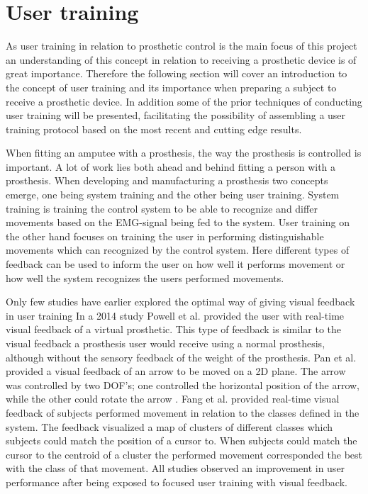 
\section{User training} \label{sec:BG:userTraining}

As user training in relation to prosthetic control is the main focus of this project an understanding of this concept in relation to receiving a prosthetic device is of great importance. Therefore the following section will cover an introduction to the concept of user training and its importance when preparing a subject to receive a prosthetic device. In addition some of the prior techniques of conducting user training will be presented, facilitating the possibility of assembling a user training protocol based on the most recent and cutting edge results.   

When fitting an amputee with a prosthesis, the way the prosthesis is controlled is important. A lot of work lies both ahead and behind fitting a person with a prosthesis. When developing and manufacturing a prosthesis two concepts emerge, one being system training and the other being user training. System training is training the control system to be able to recognize and differ movements based on the EMG-signal being fed to the system. \cite{Fougner2012} User training on the other hand focuses on training the user in performing distinguishable movements which can recognized by the control system. Here different types of feedback can be used to inform the user on how well it performs movement or how well the system recognizes the users performed movements. \cite{Powell2014,Simon2013}


Only few studies have earlier explored the optimal way of giving visual feedback in user training \cite{Jiang2012}
In a 2014 study Powell et al. \cite{Powell2014} provided the user with real-time visual feedback of a virtual prosthetic. This type of feedback is similar to the visual feedback a prosthesis user would receive using a normal prosthesis, although without the sensory feedback of the weight of the prosthesis. Pan et al. \cite{Pan2017} provided a visual feedback of an arrow to be moved on a 2D plane. The arrow was controlled by two DOF's; one controlled the horizontal position of the arrow, while the other could rotate the arrow \cite{Pan2017}. Fang et al. \cite{Fang2017} provided real-time visual feedback of subjects performed movement in relation to the classes defined in the system. The feedback visualized a map of clusters of different classes which subjects could match the position of a cursor to. When subjects could match the cursor to the centroid of a cluster the performed movement corresponded the best with the class of that movement. \cite{Fang2017} All studies observed an improvement in user performance after being exposed to focused user training with visual feedback. 
